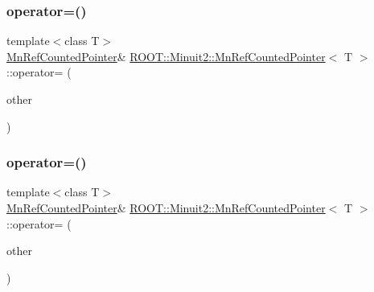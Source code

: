 \subsubsection{\texorpdfstring{operator=()}{operator=()}\hspace{0.1cm}{\footnotesize\ttfamily [1/4]}}
{\footnotesize\ttfamily template$<$class T$>$ \\
\mbox{\hyperlink{classROOT_1_1Minuit2_1_1MnRefCountedPointer}{Mn\+Ref\+Counted\+Pointer}}\& \mbox{\hyperlink{classROOT_1_1Minuit2_1_1MnRefCountedPointer}{R\+O\+O\+T\+::\+Minuit2\+::\+Mn\+Ref\+Counted\+Pointer}}$<$ T $>$\+::operator= (\begin{DoxyParamCaption}\item[{const \mbox{\hyperlink{classROOT_1_1Minuit2_1_1MnRefCountedPointer}{Mn\+Ref\+Counted\+Pointer}}$<$ T $>$ \&}]{other }\end{DoxyParamCaption})\hspace{0.3cm}{\ttfamily [inline]}}

\mbox{\label{classROOT_1_1Minuit2_1_1MnRefCountedPointer_a6a7380791625cf84a89a3b4fa32b7029}} 
\subsubsection{\texorpdfstring{operator=()}{operator=()}\hspace{0.1cm}{\footnotesize\ttfamily [2/4]}}
{\footnotesize\ttfamily template$<$class T$>$ \\
\mbox{\hyperlink{classROOT_1_1Minuit2_1_1MnRefCountedPointer}{Mn\+Ref\+Counted\+Pointer}}\& \mbox{\hyperlink{classROOT_1_1Minuit2_1_1MnRefCountedPointer}{R\+O\+O\+T\+::\+Minuit2\+::\+Mn\+Ref\+Counted\+Pointer}}$<$ T $>$\+::operator= (\begin{DoxyParamCaption}\item[{const \mbox{\hyperlink{classROOT_1_1Minuit2_1_1MnRefCountedPointer}{Mn\+Ref\+Counted\+Pointer}}$<$ T $>$ \&}]{other }\end{DoxyParamCaption})\hspace{0.3cm}{\ttfamily [inline]}}

\mbox{\label{classROOT_1_1Minuit2_1_1MnRefCountedPointer_a6867125c7f9d76199e7a6676eed5f682}} 
